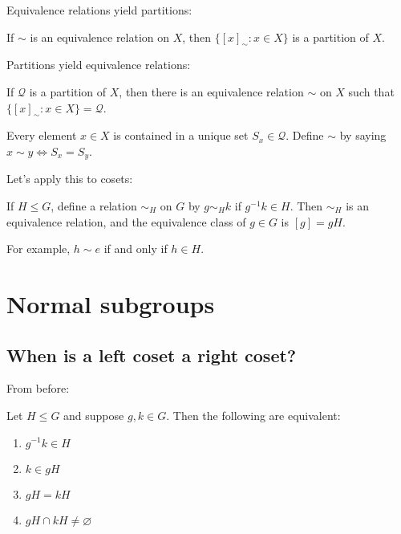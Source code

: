\documentclass[12pt,letterpaper]{report}
\begin{document}
Equivalence relations yield partitions:

\begin{cor}{}{}
  If $\sim$ is an equivalence relation on $X$, then $\{[x]_\sim : x \in X\}$ is a partition of $X$.
\end{cor}

Partitions yield equivalence relations:

\begin{cor}{}{}
  If $\mathcal{Q}$ is a partition of $X$, then there is an equivalence relation $\sim$ on $X$ such
  that $\{[x]_\sim : x \in X\} = \mathcal{Q}$.
\end{cor}

\begin{thmproof}
  Every element $x \in X$ is contained in a unique set $S_x \in \mathcal{Q}$.
  Define $\sim$ by saying $x \sim y \iff S_x = S_y$.
\end{thmproof}

Let's apply this to cosets:

\begin{prop}{}{}
  If $H \leq G$, define a relation $\sim_H$ on $G$ by $g \sim_H k$ if $g^{-1}k \in H$.
  Then $\sim_H$ is an equivalence relation, and the equivalence class of $g \in G$ is $[g] = gH$.
\end{prop}

For example, $h \sim e$ if and only if $h \in H$.

\section{Normal subgroups}

\subsection{When is a left coset a right coset?}

From before:

\begin{prop}{}{}
  Let $H \leq G$ and suppose $g, k \in G$.
  Then the following are equivalent:
  \begin{enumerate}
    \item $g^{-1}k \in H$
    \item $k \in gH$
    \item $gH = kH$
    \item $gH \cap kH \neq \varnothing$
  \end{enumerate}
\end{prop}
\end{document}
